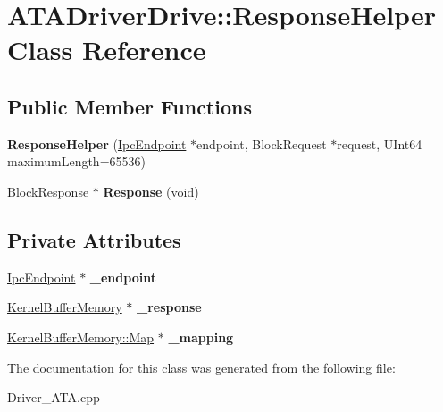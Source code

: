\hypertarget{class_a_t_a_driver_drive_1_1_response_helper}{}\section{A\+T\+A\+Driver\+Drive\+:\+:Response\+Helper Class Reference}
\label{class_a_t_a_driver_drive_1_1_response_helper}
\subsection*{Public Member Functions}
\begin{DoxyCompactItemize}
\item 
\mbox{\label{class_a_t_a_driver_drive_1_1_response_helper_a6faefe502db29f2b4d4c1efc51c56d10}} 
{\bfseries Response\+Helper} (\hyperlink{class_ipc_endpoint}{Ipc\+Endpoint} $\ast$endpoint, Block\+Request $\ast$request, U\+Int64 maximum\+Length=65536)
\item 
\mbox{\label{class_a_t_a_driver_drive_1_1_response_helper_aa97e2cd61e5f868867220d4c154ccab1}} 
Block\+Response $\ast$ {\bfseries Response} (void)
\end{DoxyCompactItemize}
\subsection*{Private Attributes}
\begin{DoxyCompactItemize}
\item 
\mbox{\label{class_a_t_a_driver_drive_1_1_response_helper_aa86214ed149cf939de5c336cfb8798d9}} 
\hyperlink{class_ipc_endpoint}{Ipc\+Endpoint} $\ast$ {\bfseries \+\_\+endpoint}
\item 
\mbox{\label{class_a_t_a_driver_drive_1_1_response_helper_aa2c5fa9560903ad69b77e22c9d02a84d}} 
\hyperlink{class_kernel_buffer_memory}{Kernel\+Buffer\+Memory} $\ast$ {\bfseries \+\_\+response}
\item 
\mbox{\label{class_a_t_a_driver_drive_1_1_response_helper_ad698e4a66802e3131d221a31d93ab1a9}} 
\hyperlink{class_kernel_buffer_memory_1_1_map}{Kernel\+Buffer\+Memory\+::\+Map} $\ast$ {\bfseries \+\_\+mapping}
\end{DoxyCompactItemize}


The documentation for this class was generated from the following file\+:\begin{DoxyCompactItemize}
\item 
Driver\+\_\+\+A\+T\+A.\+cpp\end{DoxyCompactItemize}

